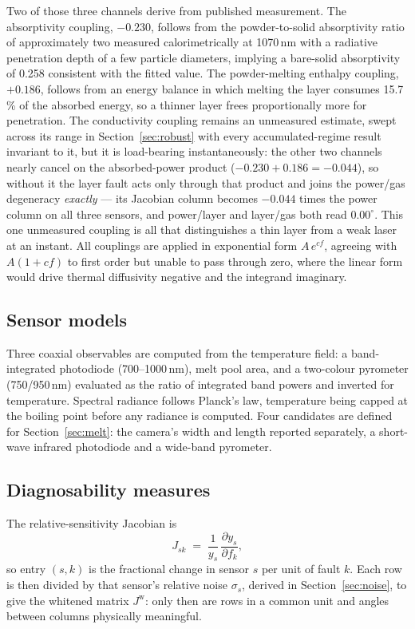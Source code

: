 \documentclass[final,5p,times,twocolumn]{elsarticle}
\begin{document}
Two of those three channels derive from published measurement. The absorptivity
coupling, $-0.230$, follows from the powder-to-solid absorptivity ratio of
approximately two measured calorimetrically at 1070\,nm \cite{Trapp2017} with a
radiative penetration depth of a few particle diameters, implying a bare-solid
absorptivity of 0.258 consistent with the fitted value. The powder-melting
enthalpy coupling, $+0.186$, follows from an energy balance in which melting the
layer consumes 15.7\,\% of the absorbed energy, so a thinner layer frees
proportionally more for penetration. The conductivity coupling remains an unmeasured estimate, swept across its range
in Section~\ref{sec:robust} with every accumulated-regime result invariant to it,
but it is load-bearing instantaneously: the other two channels nearly cancel on
the absorbed-power product ($-0.230+0.186=-0.044$), so without it the layer fault
acts only through that product and joins the power/gas degeneracy
\emph{exactly} --- its Jacobian column becomes $-0.044$ times the power column on
all three sensors, and power/layer and layer/gas both read $0.00^\circ$. This one
unmeasured coupling is all that distinguishes a thin layer from a weak laser at
an instant. All couplings are applied in exponential form $A\,e^{cf}$, agreeing with
$A(1+cf)$ to first order but unable to pass through zero, where the linear form
would drive thermal diffusivity negative and the integrand imaginary.

\subsection{Sensor models}

Three coaxial observables are computed from the temperature field: a
band-integrated photodiode (700--1000\,nm), melt pool area, and a two-colour
pyrometer (750/950\,nm) evaluated as the ratio of integrated band powers and
inverted for temperature. Spectral radiance follows Planck's law, temperature
being capped at the boiling point before any radiance is computed. Four
candidates are defined for Section~\ref{sec:melt}: the camera's width and length
reported separately, a short-wave infrared photodiode and a wide-band
pyrometer.

\subsection{Diagnosability measures}

The relative-sensitivity Jacobian is
%
\begin{equation}
J_{sk} \;=\; \frac{1}{y_s}\,\frac{\partial y_s}{\partial f_k},
\label{eq:jac}
\end{equation}
%
so entry $(s,k)$ is the fractional change in sensor $s$ per unit of fault $k$.
Each row is then
divided by that sensor's relative noise $\sigma_s$, derived in
Section~\ref{sec:noise}, to give the whitened matrix $J^{\mathrm{w}}$: only then
are rows in a common unit and angles between columns physically meaningful.
\end{document}
